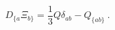 \begin{equation}
  \label{eq:killingl}
 D_{\{a} \Xi_{b\}}= \frac{1}{3} Q \delta_{ab} -  Q_{\{ab\}}\ .
\end{equation}

